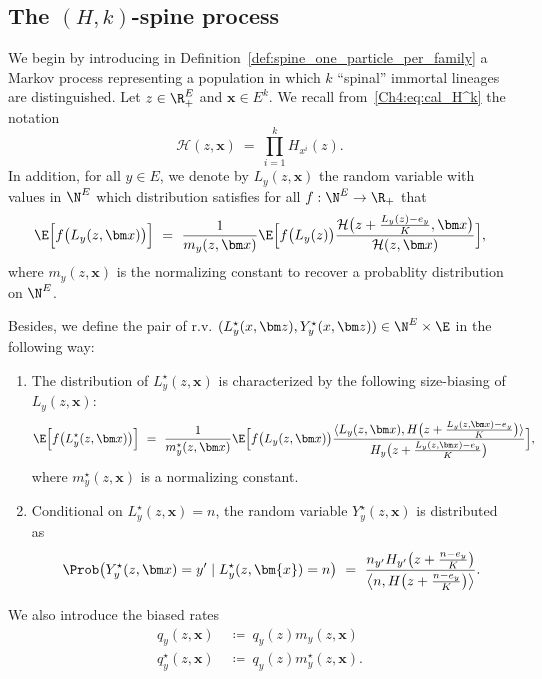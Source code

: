 \begin{refsegment}

\subsection{The $(H,k)$-spine process}\label{Ch4:sec:spine_process}
We begin by introducing in Definition~\ref{def:spine_one_particle_per_family} a Markov process representing a population in which $k$ ``spinal'' immortal lineages are distinguished.
Let $z\in\R_+^E$ and $\bm x\in E^k$. We recall from~\eqref{Ch4:eq:cal_H^k} the notation
\[
\mathcal{H}(z,\bm x)\ =\ \prod_{i=1}^k H_{x^i}(z).
\]
In addition, for all $y\in E$, we denote by  $L_y(z,\bm x)$ the random variable with values in $\N^E$ which distribution satisfies for all $f:\N^E\to \R_+$ that
\begin{equation}\label{Ch4:eq:normal_reproduction_Pk}
  \E\Big[f\big(L_{y}(z,\bm x)\big)\Big]\ =\ \frac{1}{m_y(z,\bm x)}    
\E\Big[f\big(L_{y}(z)\big)\frac{\mathcal{H}\big(z+\frac{L_{y}(z)-e_{y}}{K},\bm x\big)}{\mathcal{H}(z,\bm x)}\Big],
\end{equation}
where $m_y(z, \bm x)$ is the normalizing constant to recover a probablity distribution on $\N^E$. 

\medskip

Besides, we define the pair of r.v. $(L_{y}^{\star}(x,{\bm z}), Y_{y}^{\star}(x,{\bm z}))\in \N^E\times \E$ in the following way:
\begin{enumerate}
\item The distribution of $L^\star_y(z,\bm x)$ is characterized by the following size-biasing of $L_y(z,\bm x)$:
\begin{equation}\label{Ch4:eq:spinal_reproduction}
 \E\Big[f\big(L^\star_y(z,\bm x)\big)\Big]\ =\ \frac{1}{m^\star_y(z,\bm x)}\E\Big[f\big(L_{y}(z,\bm x)\big)\frac{\langle L_{y}(z,\bm x), H\big(z+\frac{L_{y}(z,\bm x)-e_{y}}{K}\big)\rangle}{H_y\big(z+\frac{L_{y}(z,\bm x)-e_{y}}{K}\big)}\Big],
   \end{equation}
   where $m^\star_y(z,\bm x)$ is a normalizing constant.
\item Conditional on $L^\star_{y}(z, \bm{x})=n$, the random variable $Y^\star_{y}(z, \bm{x})$ is distributed as
   \begin{equation}\label{Ch4:eq:new_spine_type}
    \Prob\big( Y^\star_y(z,\bm x) = y' \mid L^\star_{y}(z, \bm{x}) = n\big)
   \ =\
    \frac{n_{y'} H_{y'}\big(z+\frac{n-e_{y}}{K}\big)}{\big\langle n, H\big(z+\frac{n-e_y}{K}\big)\big\rangle}.
   \end{equation}
\end{enumerate}
We also introduce the biased rates
\begin{equation}\label{Ch4:eq:modified_rates_spines}
\begin{aligned}
    q_y(z, \bm{x})\ &\coloneqq\  
    q_y(z) m_y(z,\bm x)\\ 
    q^\star_y(z, \bm{x})\ &\coloneqq\  
   q_y(z) m^\star_y(z,\bm x) .
\end{aligned}
\end{equation}


\end{refsegment}

